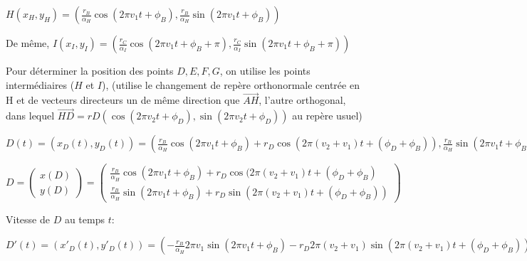 \documentclass[11pt,a4paper]{article}
\begin{document}
$H(x_H,y_H) = ( \frac{r_B}{\alpha_H} \cos(2 \pi v_1 t + \phi_B),\frac{r_B}{\alpha_H} \sin(2 \pi v_1 t + \phi_B))$

De même,
$I(x_I,y_I) = ( \frac{r_C}{\alpha_I} \cos(2 \pi v_1 t + \phi_B + \pi), \frac{r_C}{\alpha_I} \sin(2 \pi v_1 t + \phi_B + \pi))$

Pour déterminer la position des points $D,E,F,G$, on utilise les points intermédiaires ($H$ et $I$), (utilise le changement de repère  orthonormale centrée en H et de vecteurs directeurs un  de même direction que $\overrightarrow{AH}$, l'autre orthogonal, dans lequel $\overrightarrow{HD} =  rD( \cos(2 \pi v_2 t + \phi_D), \sin(2 \pi v_2 t + \phi_D))$ au repère usuel)

$ D(t) = (x_D(t),y_D(t)) = (\frac{r_B}{\alpha_H} \cos(2 \pi v_1 t + \phi_B) + r_D \cos(2 \pi (v_2 + v _1)t + (\phi_D + \phi_B)), \frac{r_B}{\alpha_H} \sin(2 \pi v_1 t + \phi_B ) + r_D \sin(2 \pi (v_2 +v_1)t +  (\phi_D + \phi_B))  )$

$
D=
\begin{pmatrix}
x(D) \\ 
y(D)
\end{pmatrix}
=
\begin{pmatrix}
\frac{r_B}{\alpha_H} \cos(2 \pi v_1 t + \phi_B) + r_D \cos(2 \pi (v_2 + v _1)t + (\phi_D + \phi_B) \\ 
\frac{r_B}{\alpha_H} \sin(2 \pi v_1 t + \phi_B ) + r_D \sin(2 \pi (v_2 +v_1)t +  (\phi_D + \phi_B))  
\end{pmatrix}
$

%
%
%


Vitesse de $D$ au temps $t$:

$ D'(t) = (x'_D(t),y'_D(t)) = (-\frac{r_B}{\alpha_H} 2 \pi v_1 \sin(2 \pi v_1 t + \phi_B) - r_D 2 \pi (v_2 + v _1) \sin(2 \pi (v_2 + v _1)t + (\phi_D + \phi_B)), \frac{r_B}{\alpha_H} 2 \pi  v_1 \cos(2 \pi v_1 t + \phi_B ) + r_D  2 \pi (v_2 + v _1) \cos(2 \pi (v_2 +v_1)t +  (\phi_D + \phi_B))  )$
\end{document}
